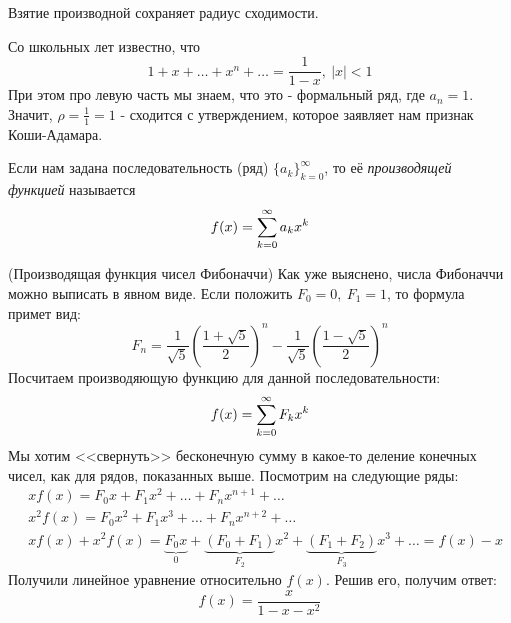 \begin{note}
	Взятие производной сохраняет радиус сходимости.
\end{note}

\begin{example}
	Со школьных лет известно, что
	\[
		1 + x + \ldots + x^n + \ldots = \frac{1}{1 - x},\ |x| < 1
	\]
	При этом про левую часть мы знаем, что это - формальный ряд, где $a_n = 1$. Значит, $\rho = \frac{1}{1} = 1$ - сходится с утверждением, которое заявляет нам признак Коши-Адамара.
\end{example}

\begin{definition}
	Если нам задана последовательность (ряд) $\{a_k\}_{k = 0}^\infty$, то её \textit{производящей функцией} называется
	\[
		f(x) = \sum\limits_{k = 0}^\infty a_k x^k
	\]
\end{definition}

\begin{example} (Производящая функция чисел Фибоначчи)
	Как уже выяснено, числа Фибоначчи можно выписать в явном виде. Если положить $F_0 = 0,\ F_1 = 1$, то формула примет вид:
	\[
		F_n = \frac{1}{\sqrt{5}}\left(\frac{1 + \sqrt{5}}{2}\right)^n - \frac{1}{\sqrt{5}}\left(\frac{1 - \sqrt{5}}{2}\right)^n
	\]
	Посчитаем производяющую функцию для данной последовательности:
	\[
		f(x) = \sum\limits_{k = 0}^\infty F_k x^k
	\]
	Мы хотим <<свернуть>> бесконечную сумму в какое-то деление конечных чисел, как для рядов, показанных выше. Посмотрим на следующие ряды:
	\begin{align*}
		&{xf(x) = F_0 x + F_1 x^2 + \ldots + F_n x^{n + 1} + \ldots}
		\\
		&{x^2f(x) = F_0 x^2 + F_1 x^3 + \ldots + F_n x^{n + 2} + \ldots}
		\\
		&{xf(x) + x^2f(x) = \underbrace{F_0 x}_{0} + \underbrace{(F_0 + F_1)}_{F_2}x^2 + \underbrace{(F_1 + F_2)}_{F_3}x^3 + \ldots = f(x) - x}
	\end{align*}
	Получили линейное уравнение относительно $f(x)$. Решив его, получим ответ:
	\[
		f(x) = \frac{x}{1 - x - x^2}
	\]
\end{example}
